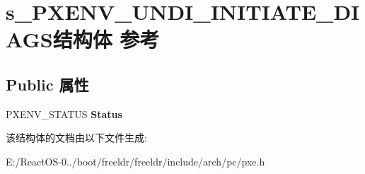 \hypertarget{structs___p_x_e_n_v___u_n_d_i___i_n_i_t_i_a_t_e___d_i_a_g_s}{}\section{s\+\_\+\+P\+X\+E\+N\+V\+\_\+\+U\+N\+D\+I\+\_\+\+I\+N\+I\+T\+I\+A\+T\+E\+\_\+\+D\+I\+A\+G\+S结构体 参考}
\label{structs___p_x_e_n_v___u_n_d_i___i_n_i_t_i_a_t_e___d_i_a_g_s}
\subsection*{Public 属性}
\begin{DoxyCompactItemize}
\item 
\mbox{\label{structs___p_x_e_n_v___u_n_d_i___i_n_i_t_i_a_t_e___d_i_a_g_s_ae36b82b9a0825237d26cf87e9f1308cc}} 
P\+X\+E\+N\+V\+\_\+\+S\+T\+A\+T\+US {\bfseries Status}
\end{DoxyCompactItemize}


该结构体的文档由以下文件生成\+:\begin{DoxyCompactItemize}
\item 
E\+:/\+React\+O\+S-\/0../boot/freeldr/freeldr/include/arch/pc/pxe.\+h\end{DoxyCompactItemize}
